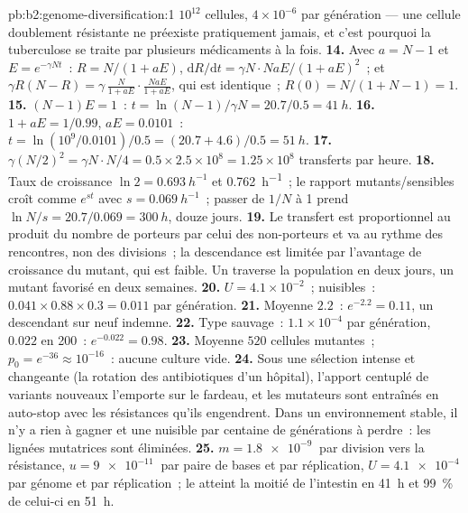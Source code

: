 \begin{solution}{pb:b2:genome-diversification:1}
$10^{12}$ cellules, $4\times 10^{-6}$ par génération --- une cellule
doublement résistante ne préexiste pratiquement jamais, et c'est
pourquoi la tuberculose se traite par plusieurs médicaments à la fois.
\textbf{14.} Avec $a = N - 1$ et $E = e^{-\gamma Nt}$~: $R = N/(1 +
aE)$, $\mathrm{d}R/\mathrm{d}t = \gamma N\cdot NaE/(1 + aE)^2$~; et
$\gamma R(N - R) = \gamma\,\frac{N}{1 + aE}\cdot\frac{NaE}{1 + aE}$,
qui est identique~; $R(0) = N/(1 + N - 1) = 1$.
\textbf{15.} $(N - 1)E = 1$~: $t = \ln(N - 1)/\gamma N = 20.7/0.5 =
\qty{41}{h}$.
\textbf{16.} $1 + aE = 1/0.99$, $aE = 0.0101$~: $t = \ln(10^{9}/0.0101)
/0.5 = (20.7 + 4.6)/0.5 = \qty{51}{h}$.
\textbf{17.} $\gamma (N/2)^2 = \gamma N\cdot N/4 = 0.5\times 2.5\times
10^{8} = 1.25\times 10^{8}$ transferts par heure.
\textbf{18.} Taux de croissance $\ln 2 = \qty{0.693}{h^{-1}}$ et
\qty{0.762}{h^{-1}}~; le rapport mutants/sensibles croît comme $e^{st}$
avec $s = \qty{0.069}{h^{-1}}$~; passer de $1/N$ à 1 prend $\ln N/s =
20.7/0.069 = \qty{300}{h}$, douze jours.
\textbf{19.} Le transfert est proportionnel au produit du nombre de
porteurs par celui des non-porteurs et va au rythme des rencontres, non
des divisions~; la descendance est limitée par l'avantage de croissance
du mutant, qui est faible. Un  traverse la population en deux
jours, un mutant favorisé en deux semaines.
\textbf{20.} $U = 4.1\times 10^{-2}$~;  nuisibles~:
$0.041\times 0.88\times
0.3 = 0.011$ par génération.
\textbf{21.} Moyenne $2.2$~: $e^{-2.2} = 0.11$, un descendant sur neuf
indemne.
\textbf{22.} Type sauvage~: $1.1\times 10^{-4}$ par génération, $0.022$
en 200~: $e^{-0.022} = 0.98$.
\textbf{23.} Moyenne $520$ cellules mutantes~; $p_0 = e^{-36} \approx
10^{-16}$~: aucune culture vide.
\textbf{24.} Sous une sélection intense et changeante (la rotation des
antibiotiques d'un hôpital), l'apport centuplé de variants nouveaux
l'emporte sur le fardeau, et les mutateurs sont entraînés en
auto-stop avec les résistances qu'ils engendrent. Dans un environnement
stable, il n'y a rien à gagner et une  nuisible par centaine de
générations à perdre~: les lignées mutatrices sont éliminées.
\textbf{25.} $m = \qty{1.8e-9}{}$ par division vers la résistance, $u =
\qty{9e-11}{}$ par paire de bases et par réplication,
$U = \qty{4.1e-4}{}$  par génome et par réplication~; le
 atteint la moitié de l'intestin en \qty{41}{h} et \qty{99}{\%}
de celui-ci en \qty{51}{h}.
\end{solution}
